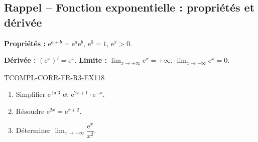 

\subsection*{Rappel -- Fonction exponentielle : propriétés et dérivée}

\textbf{Propriétés :} $\mathrm{e}^{a+b} = \mathrm{e}^a \mathrm{e}^b$, $\mathrm{e}^0 = 1$, $\mathrm{e}^x > 0$.

\textbf{Dérivée :} $(\mathrm{e}^x)' = \mathrm{e}^x$. \textbf{Limite :} $\lim_{x \to +\infty} \mathrm{e}^x = +\infty$, $\lim_{x \to -\infty} \mathrm{e}^x = 0$.

\begin{exercice}{TCOMPL-CORR-FR-R3-EX1}{1}{8}
\begin{enumerate}
  \item Simplifier $\mathrm{e}^{\ln 3}$ et $\mathrm{e}^{2x + 1} \cdot \mathrm{e}^{-x}$.
  \item Résoudre $\mathrm{e}^{2x} = \mathrm{e}^{x+2}$.
  \item Déterminer $\lim_{x \to +\infty} \dfrac{\mathrm{e}^x}{x^2}$.
\end{enumerate}
\end{exercice}

